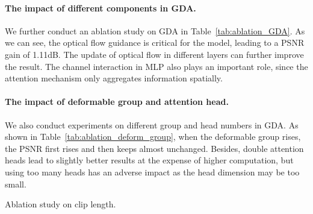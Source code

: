 \documentclass{article}
\newlength \g
\begin{document}
\paragraph{The impact of different components in GDA.}
We further conduct an ablation study on GDA in Table~\ref{tab:ablation_GDA}. As we can see, the optical flow guidance is critical for the model, leading to a PSNR gain of 1.11dB. The update of optical flow in different layers can further improve the result. The channel interaction in MLP also plays an important role, since the attention mechanism only aggregates information spatially. 

\vspace{-0.3cm}
\paragraph{The impact of deformable group and attention head.}
We also conduct experiments on different group and head numbers in GDA. As shown in Table~\ref{tab:ablation_deform_group}, when the deformable group rises, the PSNR first rises and then keeps almost unchanged. Besides, double attention heads lead to slightly better results at the expense of higher computation, but using too many heads has an adverse impact as the head dimension may be too small.




\begin{table}[h]\scriptsize
\captionsetup{font=small}\center
\begin{minipage}{0.34\textwidth}
\caption{Ablation study on clip length.}
\label{tab:ablation_clip_length}
\begin{center}
\end{center}
\end{minipage}
\hfill
\begin{minipage}{0.655\textwidth}
\caption{Ablation study on different video alignment techniques.}
\label{tab:ablation_align}
\begin{center}
\end{center}
\end{minipage}
\vspace{-0.2cm}
\end{table}
\end{document}
